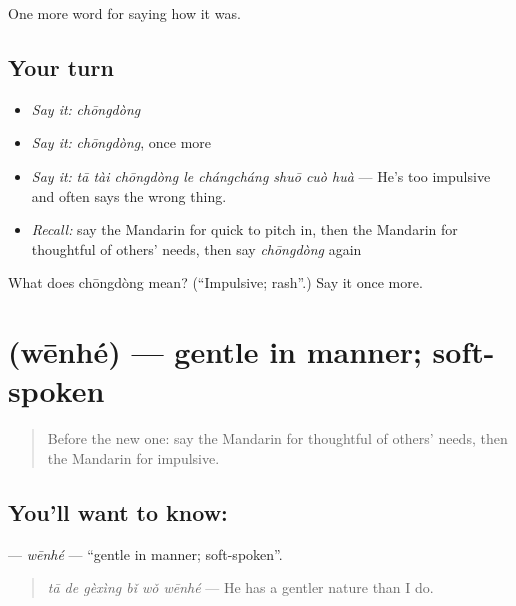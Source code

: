 \begin{grammarlens}[title={What you've built}]
One more word for saying how it was.
\end{grammarlens}

\subsection*{Your turn}
\begin{itemize}
\raggedright
  \item \emph{Say it:} \emph{chōngdòng}
  \item \emph{Say it:} \emph{chōngdòng}, once more
  \item \emph{Say it:} \emph{tā tài chōngdòng le chángcháng shuō cuò huà} — He's too impulsive and often says the wrong thing.
  \item \emph{Recall:} say the Mandarin for quick to pitch in, then the Mandarin for thoughtful of others' needs, then say \emph{chōngdòng} again
\end{itemize}

\begin{tcolorbox}[breakable,colback=teal!4,colframe=teal!35!black,title={Before you move on}]
What does chōngdòng mean? (\textquotedblleft{}Impulsive; rash\textquotedblright{}.) Say it once more.
\end{tcolorbox}
\section[\texorpdfstring{\zh{温和} (wēnhé)}{温和 (wēnhé)}]{ (wēnhé) — gentle in manner; soft-spoken}

\label{lesson:ZH-C469-wenhe}



\begin{quote}
Before the new one: say the Mandarin for thoughtful of others' needs, then the Mandarin for impulsive.
\end{quote}

\subsection*{You'll want to know: }
\textbf{} — \emph{wēnhé} — \textquotedblleft{}gentle in manner; soft-spoken\textquotedblright{}.

\begin{quote}
\textbf{} \emph{tā de gèxìng bǐ wǒ wēnhé} — He has a gentler nature than I do.
\end{quote}

